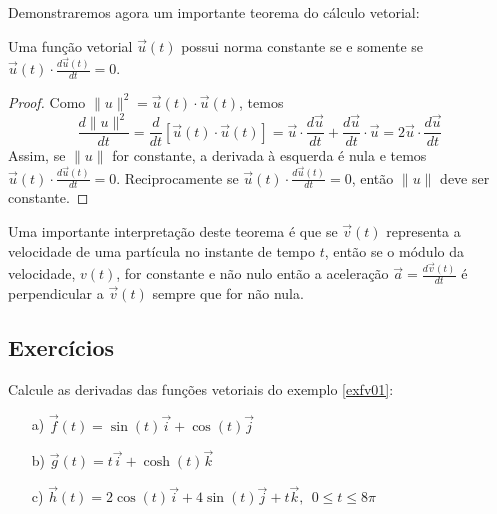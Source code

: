 Demonstraremos agora um importante teorema do cálculo vetorial:
\begin{teo}\label{teodernormacst} Uma função vetorial $\vec{u}(t)$ possui norma constante se e somente se $\vec{u}(t)\cdot\frac{d\vec{u}(t)}{dt}=0$. 
\end{teo}
\begin{proof} Como $\|u\|^2=\vec{u}(t)\cdot\vec{u}(t)$, temos
$$\frac{d \|u\|^2}{dt}=\frac{d}{dt}\left[\vec{u}(t)\cdot\vec{u}(t)\right]=\vec{u}\cdot\frac{d\vec{u}}{dt}+\frac{d\vec{u}}{dt}\cdot\vec{u}=2\vec{u}\cdot\frac{d\vec{u}}{dt}$$
Assim, se $\|u\|$ for constante, a derivada à esquerda é nula e temos $\vec{u}(t)\cdot\frac{d\vec{u}(t)}{dt}=0$. Reciprocamente se $\vec{u}(t)\cdot\frac{d\vec{u}(t)}{dt}=0$, então $\|u\|$ deve ser constante.
\end{proof}
\begin{obs} Uma importante interpretação deste teorema é que se $\vec{v}(t)$ representa a velocidade de uma partícula no instante de tempo $t$, então se o módulo da velocidade, $v(t)$, for constante e não nulo então a aceleração $\vec{a}=\frac{d\vec{v}(t)}{dt}$ é perpendicular a $\vec{v}(t)$ sempre que for não nula.  
\end{obs}







\subsection*{Exercícios}

\begin{exer}Calcule as derivadas das funções vetoriais do exemplo \ref{exfv01}:
\begin{itemize}
\item [a)] $\vec{f}(t)=\sin(t)\vec{i}+\cos(t)\vec{j}$
\item [b)] $\vec{g}(t)=t \vec{i}+\cosh(t)\vec{k}$
\item [c)] $\vec{h}(t)=2\cos(t)\vec{i}+4\sin(t)\vec{j}+t\vec{k},~~ 0\leq t \leq 8\pi$
\end{itemize}
\end{exer}

